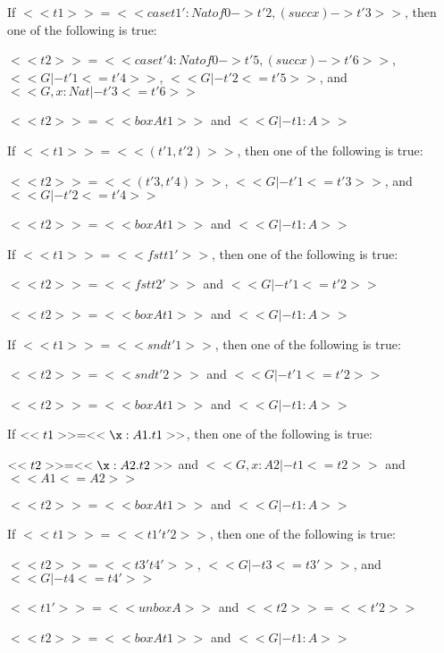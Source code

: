 \begin{lemma}
\begin{enumR}
  \item If $<<t1>> = <<case t1' : Nat of 0 -> t'2, (succ x) -> t'3>>$,
    then one of the following is true:
    \begin{enumA}
    \item $<<t2>> = <<case t'4 : Nat of 0 -> t'5, (succ x) -> t'6>>$,
      $<<G |- t'1 <= t'4>>$, $<<G |- t'2 <= t'5>>$, and $<<G, x : Nat |- t'3 <= t'6>>$
    \item $<<t2>> = <<box A t1>>$ and $<<G |- t1 : A>>$
    \end{enumA}

  \item If $<<t1>> = <<(t'1,t'2)>>$, then one of the following is true:
    \begin{enumA}
    \item $<<t2>> = <<(t'3,t'4)>>$, $<<G |- t'1 <= t'3>>$, and $<<G |- t'2 <= t'4>>$
    \item $<<t2>> = <<box A t1>>$ and $<<G |- t1 : A>>$
    \end{enumA}

  \item If $<<t1>> = <<fst t1'>>$, then one of the following is true:
    \begin{enumA}
    \item $<<t2>> = <<fst t2'>>$ and $<<G |- t'1 <= t'2>>$
    \item $<<t2>> = <<box A t1>>$ and $<<G |- t1 : A>>$
    \end{enumA}

  \item If $<<t1>> = <<snd t'1>>$, then one of the following is true:
    \begin{enumA}
    \item $<<t2>> = <<snd t'2>>$ and $<<G |- t'1 <= t'2>>$
    \item $<<t2>> = <<box A t1>>$ and $<<G |- t1 : A>>$
    \end{enumA}

  \item If $<<t1>> = <<\x:A1.t1>>$,
    then one of the following is true:
    \begin{enumA}
    \item $<<t2>> = <<\x:A2.t2>>$ and $<<G, x : A2 |- t1 <= t2>>$ and $<<A1 <= A2>>$      
    \item $<<t2>> = <<box A t1>>$ and $<<G |- t1 : A>>$
    \end{enumA}

  \item If $<<t1>> = <<t1' t'2>>$, then one of the following is true:
    \begin{enumA}
    \item $<<t2>> = <<t3' t4'>>$, $<<G |- t3 <= t3'>>$, and $<<G |- t4 <= t4'>>$
    \item $<<t1'>> = <<unbox A>>$ and $<<t2>> = <<t'2>>$
    \item $<<t2>> = <<box A t1>>$ and $<<G |- t1 : A>>$
    \end{enumA}
    

\end{enumR}
\end{lemma}
